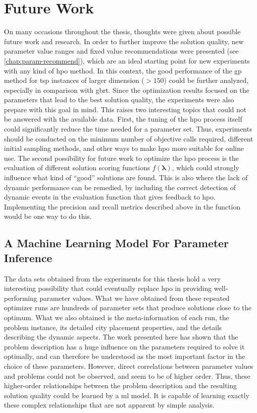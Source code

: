 \section{Future Work}

On many occasions throughout the thesis, thoughts were given about possible future work and research. 
In order to further improve the solution quality, new parameter value ranges and fixed value recommendations were presented (see \cref{chap:param-recommend}), which are an ideal starting point for new experiments with any kind of \gls{hpo} method. In this context, the good performance of the \gls{gp} method for \gls{tsp} instances of larger dimension ($>150$) could be further analyzed, especially in comparison with \gls{gbrt}. Since the optimization results focused on the parameters that lead to the best solution quality, the experiments were also prepare with this goal in mind. This raises two interesting topics that could not be answered with the available data. First, the tuning of the \gls{hpo} process itself could significantly reduce the time needed for a parameter set. Thus, experiments should be conducted on the minimum number of objective calls required, different initial sampling methods, and other ways to make \gls{hpo} more suitable for online use. The second possibility for future work to optimize the \gls{hpo} process is the evaluation of different solution scoring functions $f(\mathbf{\lambda})$, which could strongly influence what kind of \enquote{good} solutions are found. This is also where the lack of dynamic performance can be remedied, by including the correct detection of dynamic events in the evaluation function that gives feedback to \gls{hpo}. Implementing the precision and recall metrics described above in the function would be one way to do this.

\subsection{A Machine Learning Model For Parameter Inference}

The data sets obtained from the experiments for this thesis hold a very interesting possibility that could eventually replace \gls{hpo} in providing well-performing parameter values. What we have obtained from these repeated optimizer runs are hundreds of parameter sets that produce solutions close to the optimum. What we also obtained is the meta-information of each run, the problem instance, its detailed city placement properties, and the details describing the dynamic aspects. The work presented here has shown that the problem description has a huge influence on the parameters required to solve it optimally, and can therefore be understood as the most important factor in the choice of these parameters. However, direct correlations between parameter values and problems could not be observed, and seem to be of higher order. Thus, these higher-order relationships between the problem description and the resulting solution quality could be learned by a \gls{ml} model. It is capable of learning exactly these complex relationships that are not apparent by simple analysis.

